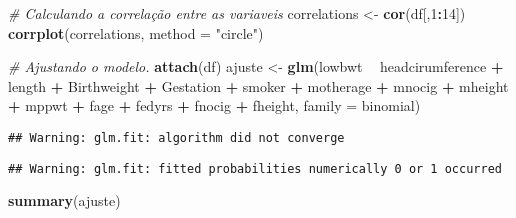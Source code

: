 \documentclass[]{article}
\newenvironment{Shaded}{\begin{snugshade}}{\end{snugshade}}
\newcommand{\CommentTok}[1]{\textcolor[rgb]{0.56,0.35,0.01}{\textit{#1}}}
\newcommand{\DataTypeTok}[1]{\textcolor[rgb]{0.13,0.29,0.53}{#1}}
\newcommand{\DecValTok}[1]{\textcolor[rgb]{0.00,0.00,0.81}{#1}}
\newcommand{\KeywordTok}[1]{\textcolor[rgb]{0.13,0.29,0.53}{\textbf{#1}}}
\newcommand{\NormalTok}[1]{#1}
\newcommand{\OperatorTok}[1]{\textcolor[rgb]{0.81,0.36,0.00}{\textbf{#1}}}
\newcommand{\StringTok}[1]{\textcolor[rgb]{0.31,0.60,0.02}{#1}}
\begin{document}
\begin{Shaded}
\begin{Highlighting}[]
\CommentTok{# Calculando a correlação entre as variaveis}
\NormalTok{correlations <-}\StringTok{ }\KeywordTok{cor}\NormalTok{(df[,}\DecValTok{1}\OperatorTok{:}\DecValTok{14}\NormalTok{])}
\KeywordTok{corrplot}\NormalTok{(correlations, }\DataTypeTok{method =} \StringTok{"circle"}\NormalTok{)}

\CommentTok{# Ajustando o modelo.}
\KeywordTok{attach}\NormalTok{(df)}
\NormalTok{ajuste <-}\StringTok{ }\KeywordTok{glm}\NormalTok{(lowbwt }\OperatorTok{~}\StringTok{ }\NormalTok{headcirumference }\OperatorTok{+}\StringTok{ }\NormalTok{length }\OperatorTok{+}\StringTok{ }\NormalTok{Birthweight }\OperatorTok{+}\StringTok{ }\NormalTok{Gestation }\OperatorTok{+}\StringTok{ }\NormalTok{smoker }\OperatorTok{+}
\StringTok{              }\NormalTok{motherage }\OperatorTok{+}\StringTok{ }\NormalTok{mnocig }\OperatorTok{+}\StringTok{ }\NormalTok{mheight }\OperatorTok{+}\StringTok{ }\NormalTok{mppwt }\OperatorTok{+}\StringTok{ }\NormalTok{fage }\OperatorTok{+}\StringTok{ }\NormalTok{fedyrs }\OperatorTok{+}\StringTok{ }\NormalTok{fnocig }\OperatorTok{+}\StringTok{ }\NormalTok{fheight, }
              \DataTypeTok{family =}\NormalTok{ binomial)}
\end{Highlighting}
\end{Shaded}

\begin{verbatim}
## Warning: glm.fit: algorithm did not converge
\end{verbatim}

\begin{verbatim}
## Warning: glm.fit: fitted probabilities numerically 0 or 1 occurred
\end{verbatim}

\begin{Shaded}
\begin{Highlighting}[]
\KeywordTok{summary}\NormalTok{(ajuste)}
\end{Highlighting}
\end{Shaded}
\end{document}
